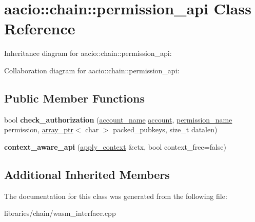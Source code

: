\hypertarget{classaacio_1_1chain_1_1permission__api}{}\section{aacio\+:\+:chain\+:\+:permission\+\_\+api Class Reference}
\label{classaacio_1_1chain_1_1permission__api}


Inheritance diagram for aacio\+:\+:chain\+:\+:permission\+\_\+api\+:


Collaboration diagram for aacio\+:\+:chain\+:\+:permission\+\_\+api\+:
\subsection*{Public Member Functions}
\begin{DoxyCompactItemize}
\item 
\mbox{\label{classaacio_1_1chain_1_1permission__api_aebaf9e2e94a9d58e8cd40dba63d387d7}} 
bool {\bfseries check\+\_\+authorization} (\mbox{\hyperlink{structaacio_1_1chain_1_1name}{account\+\_\+name}} \mbox{\hyperlink{structaccount}{account}}, \mbox{\hyperlink{structaacio_1_1chain_1_1name}{permission\+\_\+name}} permission, \mbox{\hyperlink{structaacio_1_1chain_1_1array__ptr}{array\+\_\+ptr}}$<$ char $>$ packed\+\_\+pubkeys, size\+\_\+t datalen)
\item 
\mbox{\label{classaacio_1_1chain_1_1permission__api_ad2711b0a72fe3f1b0b1512c97e16d285}} 
{\bfseries context\+\_\+aware\+\_\+api} (\mbox{\hyperlink{classaacio_1_1chain_1_1apply__context}{apply\+\_\+context}} \&ctx, bool context\+\_\+free=false)
\end{DoxyCompactItemize}
\subsection*{Additional Inherited Members}


The documentation for this class was generated from the following file\+:\begin{DoxyCompactItemize}
\item 
libraries/chain/wasm\+\_\+interface.\+cpp\end{DoxyCompactItemize}
